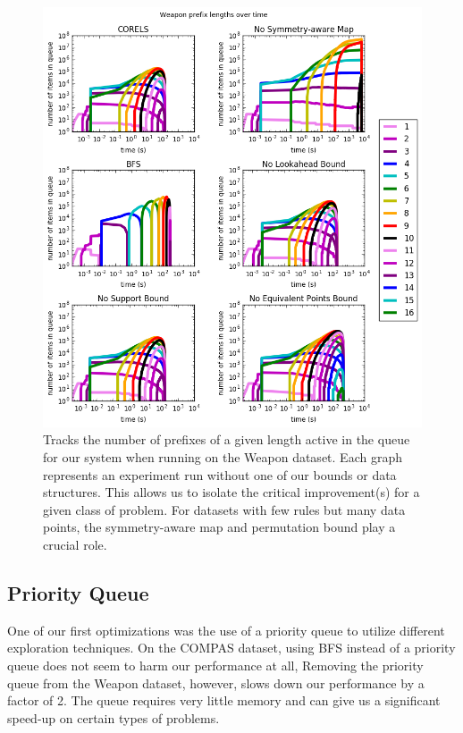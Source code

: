 \begin{figure}
\begin{center}
\includegraphics[width=1.1\textwidth]{figs/weapon_prefixes.png}
\end{center}
\vspace{-0.7cm}
\caption{Tracks the number of prefixes of a given length active in the queue for our system when running on the Weapon dataset.
Each graph represents an experiment run without one of our bounds or data structures.
This allows us to isolate the critical improvement(s) for a given class of problem.
For datasets with few rules but many data points, the symmetry-aware map and permutation bound play a crucial role.
}
\label{fig:weapon-prefixes}
\end{figure}

\subsection{Priority Queue} \label{exp:priority}

One of our first optimizations was the use of a priority queue to utilize different exploration techniques. 
On the COMPAS dataset, using BFS instead of a priority queue does not seem to harm our performance at all, 
Removing the priority queue from the Weapon dataset, however, slows down our performance by a factor of 2.
The queue requires very little memory and can give us a significant speed-up on certain types of problems.

